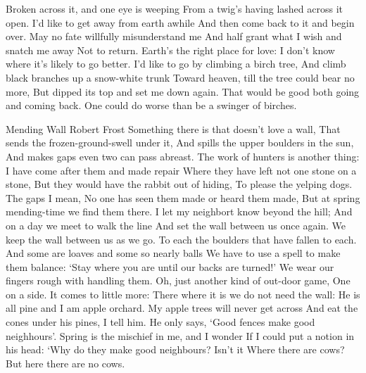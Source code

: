 \begin{poem}
     Broken across it, and one eye is weeping 			  
     From a twig's having lashed across it open. 		  
     I'd like to get away from earth awhile 			  
     And then come back to it and begin over. 			  
     May no fate willfully misunderstand me 			  
     And half grant what I wish and snatch me away 		  
     Not to return. Earth's the right place for love: 		  
     I don't know where it's likely to go better. 		  
     I'd like to go by climbing a birch tree, 			  
     And climb black branches up a snow-white trunk 		  
     Toward heaven, till the tree could bear no more, 		  
     But dipped its top and set me down again. 			  
     That would be good both going and coming back. 		  
     One could do worse than be a swinger of birches.             
\end{poem}

\begin{poem}
{Mending Wall }
{Robert Frost}
     Something there is that doesn't love a wall,                
     That sends the frozen-ground-swell under it, 		 
     And spills the upper boulders in the sun, 			 
     And makes gaps even two can pass abreast. 			 
     The work of hunters is another thing: 			 
     I have come after them and made repair 			 
     Where they have left not one stone on a stone, 		 
     But they would have the rabbit out of hiding, 		 
     To please the yelping dogs. The gaps I mean, 		 
     No one has seen them made or heard them made, 		 
     But at spring mending-time we find them there. 		 
     I let my neighbort know beyond the hill; 			 
     And on a day we meet to walk the line 			 
     And set the wall between us once again. 			 
     We keep the wall between us as we go. 			 
     To each the boulders that have fallen to each. 		 
     And some are loaves and some so nearly balls 		 
     We have to use a spell to make them balance: 		 
     `Stay where you are until our backs are turned!' 		 
     We wear our fingers rough with handling them. 		 
     Oh, just another kind of out-door game, 			 
     One on a side. It comes to little more: 			 
     There where it is we do not need the wall: 		 
     He is all pine and I am apple orchard. 			 
     My apple trees will never get across 			 
     And eat the cones under his pines, I tell him. 		 
     He only says, `Good fences make good neighhours'. 		 
     Spring is the mischief in me, and I wonder 		 
     If I could put a notion in his head: 			 
     `Why do they make good neighbours? Isn't it 		 
     Where there are cows? 					 
     But here there are no cows. 				 

\end{poem}
